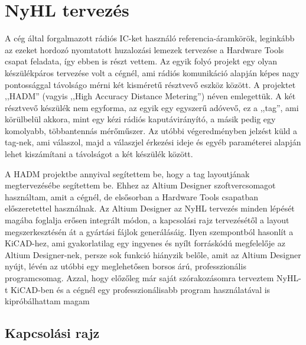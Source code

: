 \documentclass[a4paper,12pt,titlepage]{article}
\begin{document}
   \section{NyHL tervezés}
        A cég által forgalmazott rádiós IC-ket használó referencia-áramkörök, leginkább az ezeket hordozó nyomtatott huzalozási lemezek tervezése a Hardware Tools csapat feladata, így ebben is részt vettem. Az egyik folyó projekt egy olyan készülékpáros tervezése volt a cégnél, ami rádiós komunikáció alapján képes nagy pontossággal távolságo mérni két kisméretű résztvevő eszköz között. A projektet ,,HADM'' (vagyis ,,High Accuracy Distance Metering'') néven emlegettük. A két résztvevő készülék nem egyforma, az egyik egy egyszerű adóvevő, ez a ,,tag'', ami körülbelül akkora, mint egy kézi rádiós kaputávirányító, a másik pedig egy komolyabb, többantennás mérőműszer. Az utóbbi végeredményben jelzést küld a tag-nek, ami válaszol, majd a válaszjel érkezési ideje és egyéb paraméterei alapján lehet kiszámítani a távolságot a két készülék között.
        \par
        A HADM projektbe annyival segítettem be, hogy a tag layoutjának megtervezésébe segítettem be. Ehhez az Altium Designer szoftvercsomagot használtam, amit a cégnél, de elsősorban a Hardware Tools csapatban előszeretettel használnak. Az Altium Designer az NyHL tervezés minden lépését magába foglalja erősen integrált módon, a kapcsolási rajz tervezésétől a layout megszerkesztésén át a gyártási fájlok generálásáig. Ilyen szempontból hasonlít a KiCAD-hez, ami gyakorlatilag egy ingyenes és nyílt forráskódú megfelelője az Altium Designer-nek, persze sok funkció hiányzik belőle, amit az Altium Designer nyújt, lévén az utóbbi egy meglehetősen borsos árú, professzionális programcsomag. Azzal, hogy előzőleg már saját szórakozásomra terveztem NyHL-t KiCAD-ben és a cégnél egy professzionálisabb program használatával is kipróbálhattam magam
        \subsection{Kapcsolási rajz}
\end{document}

